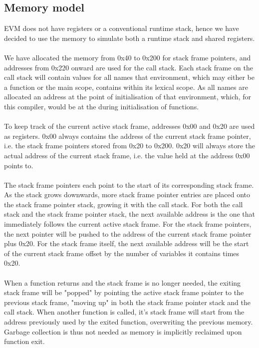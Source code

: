\subsection{Memory model}
EVM does not have registers or a conventional runtime stack, hence we have decided to use the memory to simulate both a runtime stack and shared registers. \\\\
We have allocated the memory from 0x40 to 0x200 for stack frame pointers, and addresses from 0x220 onward are used for the call stack. Each stack frame on the call stack will contain values for all names that environment, which may either be a function or the main scope, contains within its lexical scope. As all names are allocated an address at the point of initialisation of that environment, which, for this compiler, would be at the during initialisation of functions. \\\\
To keep track of the current active stack frame, addresses 0x00 and 0x20 are used as registers. 0x00 always contains the address of the current stack frame pointer, i.e. the stack frame pointers stored from 0x20 to 0x200. 0x20 will always store the actual address of the current stack frame, i.e. the value held at the address 0x00 points to. \\\\
The stack frame pointers each point to the start of its corresponding stack frame. As the stack grows downwards, more stack frame pointer entries are placed onto the stack frame pointer stack, growing it with the call stack. For both the call stack and the stack frame pointer stack, the next available address is the one that immediately follows the current active stack frame. For the stack frame pointers, the next pointer will be pushed to the address of the current stack frame pointer plus 0x20. For the stack frame itself, the next available address will be the start of the current stack frame offset by the number of variables it contains times 0x20. \\\\
When a function returns and the stack frame is no longer needed, the exiting stack frame will be "popped" by pointing the active stack frame pointer to the previous stack frame, "moving up" in both the stack frame pointer stack and the call stack. When another function is called, it's stack frame will start from the address previously used by the exited function, overwriting the previous memory. Garbage collection is thus not needed as memory is implicitly reclaimed upon function exit. 
